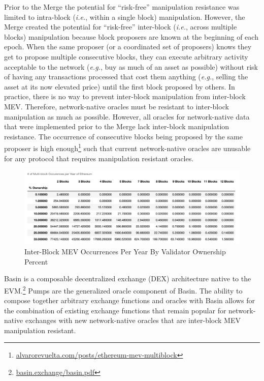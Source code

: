 \documentclass[tikz]{article}
\newcommand{\fref}[1]{\footnote{\href{http://#1}{#1}}}
\begin{document}
Prior to the Merge the potential for “risk-free” manipulation resistance was limited to intra-block (\textit{i.e.}, within a single block) manipulation. However, the Merge created the potential for “risk-free” inter-block (\textit{i.e.}, across multiple blocks) manipulation because block proposers are known at the beginning of each epoch. When the same proposer (or a coordinated set of proposers) knows they get to propose multiple consecutive blocks, they can execute arbitrary activity acceptable to the network (\textit{e.g.}, buy as much of an asset as possible) without risk of having any transactions processed that cost them anything (\textit{e.g.}, selling the asset at its now elevated price) until the first block proposed by others. In practice, there is no way to prevent inter-block manipulation from inter-block MEV. Therefore, network-native oracles must be resistant to inter-block manipulation as much as possible. However, all oracles for network-native data that were implemented prior to the Merge lack inter-block manipulation resistance. The occurrence of consecutive blocks being proposed by the same proposer is high enough\fref{alvarorevuelta.com/posts/ethereum-mev-multiblock} such that current network-native oracles are unusable for any protocol that requires manipulation resistant oracles. 

\vspace*{-1mm}
\begin{figure}[h!]
    \centering
    \includegraphics[scale=.25]{Figure15}
    \vspace*{-7mm}
    \caption{Inter-Block MEV Occurrences Per Year By Validator Ownership Percent}
    \label{fig 2}
\end{figure}

Basin is a composable decentralized exchange (DEX) architecture native to the EVM.\footnote{\href{https://basin.exchange/basin.pdf}{basin.exchange/basin.pdf}} Pumps are the generalized oracle component of Basin. The ability to compose together arbitrary exchange functions and oracles with Basin allows for the combination of existing exchange functions that remain popular for network-native exchanges with new network-native oracles that are inter-block MEV manipulation resistant.
\end{document}
